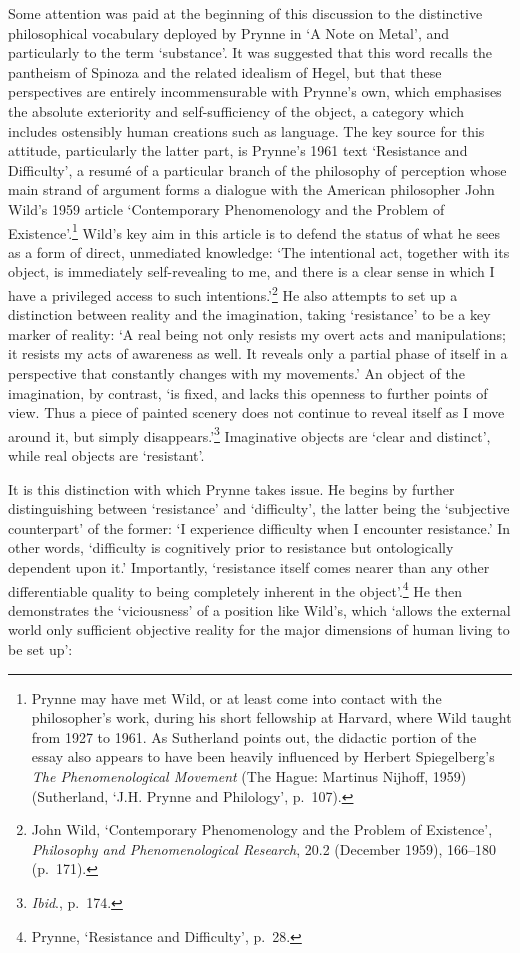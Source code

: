 \documentclass[]{article}
\begin{document}
Some attention was paid at the beginning of this discussion to the
distinctive philosophical vocabulary deployed by Prynne in ‘A Note on
Metal’, and particularly to the term ‘substance’. It was suggested that
this word recalls the pantheism of Spinoza and the related idealism of
Hegel, but that these perspectives are entirely incommensurable with
Prynne’s own, which emphasises the absolute exteriority and
self-sufficiency of the object, a category which includes ostensibly
human creations such as language. The key source for this attitude,
particularly the latter part, is Prynne’s 1961 text ‘Resistance and
Difficulty’, a resumé of a particular branch of the philosophy of
perception whose main strand of argument forms a dialogue with the
American philosopher John Wild’s 1959 article ‘Contemporary
Phenomenology and the Problem of Existence’.\footnote{Prynne may have
  met Wild, or at least come into contact with the philosopher’s work,
  during his short fellowship at Harvard, where Wild taught from 1927 to
  1961. As Sutherland points out, the didactic portion of the essay also
  appears to have been heavily influenced by Herbert Spiegelberg’s
  \emph{The Phenomenological Movement} (The Hague: Martinus Nijhoff,
  1959) (Sutherland, ‘J.H. Prynne and Philology’, p.~107).} Wild’s key
aim in this article is to defend the status of what he sees as a form of
direct, unmediated knowledge: ‘The intentional act, together with its
object, is immediately self-revealing to me, and there is a clear sense
in which I have a privileged access to such intentions.’\footnote{John
  Wild, ‘Contemporary Phenomenology and the Problem of Existence’,
  \emph{Philosophy and Phenomenological Research}, 20.2 (December 1959),
  166–180 (p.~171).} He also attempts to set up a distinction between
reality and the imagination, taking ‘resistance’ to be a key marker of
reality: ‘A real being not only resists my overt acts and manipulations;
it resists my acts of awareness as well. It reveals only a partial phase
of itself in a perspective that constantly changes with my movements.’
An object of the imagination, by contrast, ‘is fixed, and lacks this
openness to further points of view. Thus a piece of painted scenery does
not continue to reveal itself as I move around it, but simply
disappears.’\footnote{\emph{Ibid}., p.~174.} Imaginative objects are
‘clear and distinct’, while real objects are ‘resistant’.

It is this distinction with which Prynne takes issue. He begins by
further distinguishing between ‘resistance’ and ‘difficulty’, the latter
being the ‘subjective counterpart’ of the former: ‘I experience
difficulty when I encounter resistance.’ In other words, ‘difficulty is
cognitively prior to resistance but ontologically dependent upon it.’
Importantly, ‘resistance itself comes nearer than any other
differentiable quality to being completely inherent in the
object’.\footnote{Prynne, ‘Resistance and Difficulty’, p.~28.} He then
demonstrates the ‘viciousness’ of a position like Wild’s, which ‘allows
the external world only sufficient objective reality for the major
dimensions of human living to be set up’:
\end{document}
